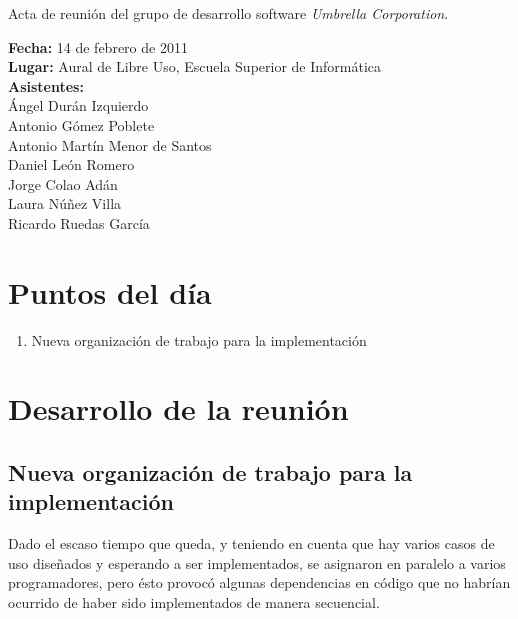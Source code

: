 \documentclass[a4paper,11pt,oneside]{article}
\begin{document}
\pagestyle{fancy}


\begin{center}
{\Large
Acta de reunión del grupo de desarrollo software \textit{Umbrella
Corporation}.}
\end{center}
\textbf{Fecha:} 14 de febrero de 2011 \\
\textbf{Lugar:} Aural de Libre Uso, Escuela Superior de Informática \\
\textbf{Asistentes:}\\
\hspace*{1cm}Ángel Durán Izquierdo\\
\hspace*{1cm}Antonio Gómez Poblete\\
\hspace*{1cm}Antonio Martín Menor de Santos\\
\hspace*{1cm}Daniel León Romero\\
\hspace*{1cm}Jorge Colao Adán\\
\hspace*{1cm}Laura Núñez Villa\\
\hspace*{1cm}Ricardo Ruedas García


\section*{Puntos del día}

\begin{enumerate}
\item Nueva organización de trabajo para la implementación
\end{enumerate}


\section*{Desarrollo de la reunión}

\subsection*{Nueva organización de trabajo para la implementación}

Dado el escaso tiempo que queda, y teniendo en cuenta que hay varios casos de
uso diseñados y esperando a ser implementados, se asignaron en paralelo a
varios programadores, pero ésto provocó algunas dependencias en código que no
habrían ocurrido de haber sido implementados de manera secuencial.
\end{document}
